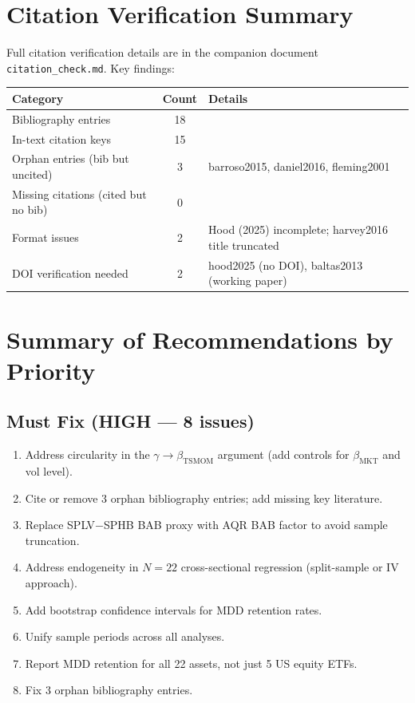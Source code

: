 \documentclass[12pt,a4paper]{article}
\begin{document}
\section{Citation Verification Summary}

Full citation verification details are in the companion document \texttt{citation\_check.md}. Key findings:

\begin{center}
\small
\begin{tabular}{lcp{6cm}}
\toprule
Category & Count & Details \\
\midrule
Bibliography entries & 18 & \\
In-text citation keys & 15 & \\
Orphan entries (bib but uncited) & 3 & barroso2015, daniel2016, fleming2001 \\
Missing citations (cited but no bib) & 0 & \\
Format issues & 2 & Hood (2025) incomplete; harvey2016 title truncated \\
DOI verification needed & 2 & hood2025 (no DOI), baltas2013 (working paper) \\
\bottomrule
\end{tabular}
\end{center}


\section{Summary of Recommendations by Priority}

\subsection*{Must Fix (HIGH --- 8 issues)}
\begin{enumerate}
\item[\textbf{1.1}] Address circularity in the $\gamma \to \beta_{\text{TSMOM}}$ argument (add controls for $\beta_{\text{MKT}}$ and vol level).
\item[\textbf{3.1}] Cite or remove 3 orphan bibliography entries; add missing key literature.
\item[\textbf{5.1}] Replace SPLV$-$SPHB BAB proxy with AQR BAB factor to avoid sample truncation.
\item[\textbf{7.1}] Address endogeneity in $N = 22$ cross-sectional regression (split-sample or IV approach).
\item[\textbf{7.2}] Add bootstrap confidence intervals for MDD retention rates.
\item[\textbf{8.1}] Unify sample periods across all analyses.
\item[\textbf{9.1}] Report MDD retention for all 22 assets, not just 5 US equity ETFs.
\item[\textbf{10.1}] Fix 3 orphan bibliography entries.
\end{enumerate}
\end{document}
